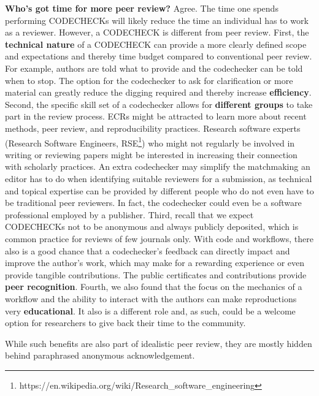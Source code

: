 \documentclass[12pt]{article}
\begin{document}
\textbf{Who's got time for more peer review?} Agree.
The time one spends performing CODECHECKs will likely reduce the time an individual has to work as a reviewer.
However, a CODECHECK is different from peer review.
First, the \textbf{technical nature} of a CODECHECK can provide a more 
clearly defined scope and expectations and thereby time budget compared to conventional 
peer review. 
For example, authors are told what to provide and the codechecker can be told when to stop.
The option for the codechecker to ask for clarification or more 
material can greatly reduce the digging required and thereby
increase \textbf{efficiency}.
Second, the specific skill set of a codechecker allows for \textbf{different groups} to take part in the review process.
ECRs might be attracted to learn more about recent methods, peer review, and reproducibility practices.
Research software experts (Research Software Engineers, RSE\footnote{https://en.wikipedia.org/wiki/Research_software_engineering}) who might
not regularly be involved in writing or reviewing papers might be interested in increasing their connection with scholarly practices.
An extra codechecker may simplify the matchmaking an editor has to do
when identifying suitable reviewers for a submission, as technical and
topical expertise can be provided by different people who do not even have to be traditional peer reviewers.
In fact, the codechecker could even be a software professional employed by a publisher.
Third, recall that we expect CODECHECKs not to be anonymous and always
publicly deposited, which is common practice for reviews of few journals only.
With code and workflows, there also is a good chance that a codechecker's
feedback can directly impact and improve the author's 
work, which may make for a rewarding experience or even provide tangible contributions.
The public certificates and contributions provide \textbf{peer recognition}.
Fourth, we also found that the focus on the mechanics of a
workflow and the ability to interact with the authors can make
reproductions very \textbf{educational}. It also is a different role and, as such, could
be a welcome option for researchers to give back their time to the community.

While such benefits are also part of idealistic peer review, they are mostly hidden behind paraphrased anonymous acknowledgement.
\end{document}

